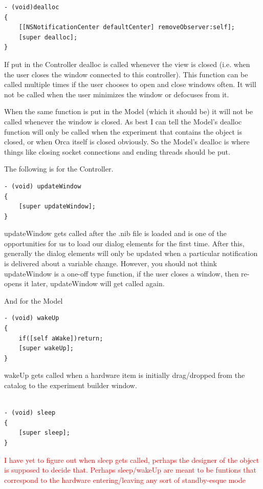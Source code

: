 \documentclass[12pt,a4paper]{article}
\begin{document}
\begin{lstlisting}
- (void)dealloc
{
    [[NSNotificationCenter defaultCenter] removeObserver:self];
    [super dealloc];
}
\end{lstlisting}
If put in the Controller dealloc is called whenever the view is closed (i.e. when the user closes the window connected to this controller).
This function can be called multiple times if the user chooses to open and close windows often. It will not be called when the user minimizes the window or defocuses from it.

When the same function is put in the Model (which it should be) it will not be called whenever the window is closed. As best I can tell the Model's dealloc function will only be called when the experiment that contains the object is closed, or when Orca itself is closed obviously. So the Model's dealloc is where things like closing socket connections and ending threads should be put.

The following is for the Controller.
\begin{lstlisting}
- (void) updateWindow
{
    [super updateWindow];
}
\end{lstlisting}
updateWindow gets called after the .nib file is loaded and is one of the opportunities for us to load our dialog elements for the first time. After this, generally the dialog elements will only
be updated when a particular notification is delivered about a variable change.
However, you should not think updateWindow is a one-off type function, if the user closes a window, 
then re-opens it later, updateWindow will get called again.




And for the Model

\begin{lstlisting}
- (void) wakeUp
{
    if([self aWake])return;
    [super wakeUp];
}
\end{lstlisting}
wakeUp gets called when a hardware item is initially drag/dropped from the catalog to the experiment builder window.
\begin{lstlisting}

- (void) sleep
{
    [super sleep];
}
\end{lstlisting}
\textcolor{red}{I have yet to figure out when sleep gets called, perhaps the designer of the object is supposed to decide that. 
Perhaps sleep/wakeUp are meant to be funtions that correspond to the hardware entering/leaving any sort of standby-esque mode }\\
\end{document}
